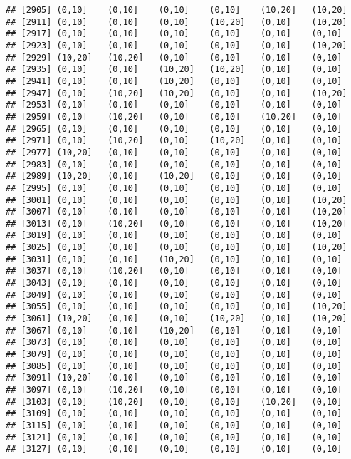 \documentclass[]{article}
\begin{document}
\begin{verbatim}
## [2905] (0,10]    (0,10]    (0,10]    (0,10]    (10,20]   (10,20]  
## [2911] (0,10]    (0,10]    (0,10]    (10,20]   (0,10]    (10,20]  
## [2917] (0,10]    (0,10]    (0,10]    (0,10]    (0,10]    (0,10]   
## [2923] (0,10]    (0,10]    (0,10]    (0,10]    (0,10]    (10,20]  
## [2929] (10,20]   (10,20]   (0,10]    (0,10]    (0,10]    (0,10]   
## [2935] (0,10]    (0,10]    (10,20]   (10,20]   (0,10]    (0,10]   
## [2941] (0,10]    (0,10]    (10,20]   (0,10]    (0,10]    (0,10]   
## [2947] (0,10]    (10,20]   (10,20]   (0,10]    (0,10]    (10,20]  
## [2953] (0,10]    (0,10]    (0,10]    (0,10]    (0,10]    (0,10]   
## [2959] (0,10]    (10,20]   (0,10]    (0,10]    (10,20]   (0,10]   
## [2965] (0,10]    (0,10]    (0,10]    (0,10]    (0,10]    (0,10]   
## [2971] (0,10]    (10,20]   (0,10]    (10,20]   (0,10]    (0,10]   
## [2977] (10,20]   (0,10]    (0,10]    (0,10]    (0,10]    (0,10]   
## [2983] (0,10]    (0,10]    (0,10]    (0,10]    (0,10]    (0,10]   
## [2989] (10,20]   (0,10]    (10,20]   (0,10]    (0,10]    (0,10]   
## [2995] (0,10]    (0,10]    (0,10]    (0,10]    (0,10]    (0,10]   
## [3001] (0,10]    (0,10]    (0,10]    (0,10]    (0,10]    (10,20]  
## [3007] (0,10]    (0,10]    (0,10]    (0,10]    (0,10]    (10,20]  
## [3013] (0,10]    (10,20]   (0,10]    (0,10]    (0,10]    (10,20]  
## [3019] (0,10]    (0,10]    (0,10]    (0,10]    (0,10]    (0,10]   
## [3025] (0,10]    (0,10]    (0,10]    (0,10]    (0,10]    (10,20]  
## [3031] (0,10]    (0,10]    (10,20]   (0,10]    (0,10]    (0,10]   
## [3037] (0,10]    (10,20]   (0,10]    (0,10]    (0,10]    (0,10]   
## [3043] (0,10]    (0,10]    (0,10]    (0,10]    (0,10]    (0,10]   
## [3049] (0,10]    (0,10]    (0,10]    (0,10]    (0,10]    (0,10]   
## [3055] (0,10]    (0,10]    (0,10]    (0,10]    (0,10]    (10,20]  
## [3061] (10,20]   (0,10]    (0,10]    (10,20]   (0,10]    (10,20]  
## [3067] (0,10]    (0,10]    (10,20]   (0,10]    (0,10]    (0,10]   
## [3073] (0,10]    (0,10]    (0,10]    (0,10]    (0,10]    (0,10]   
## [3079] (0,10]    (0,10]    (0,10]    (0,10]    (0,10]    (0,10]   
## [3085] (0,10]    (0,10]    (0,10]    (0,10]    (0,10]    (0,10]   
## [3091] (10,20]   (0,10]    (0,10]    (0,10]    (0,10]    (0,10]   
## [3097] (0,10]    (10,20]   (0,10]    (0,10]    (0,10]    (0,10]   
## [3103] (0,10]    (10,20]   (0,10]    (0,10]    (10,20]   (0,10]   
## [3109] (0,10]    (0,10]    (0,10]    (0,10]    (0,10]    (0,10]   
## [3115] (0,10]    (0,10]    (0,10]    (0,10]    (0,10]    (0,10]   
## [3121] (0,10]    (0,10]    (0,10]    (0,10]    (0,10]    (0,10]   
## [3127] (0,10]    (0,10]    (0,10]    (0,10]    (0,10]    (0,10]   

\end{verbatim}
\end{document}
